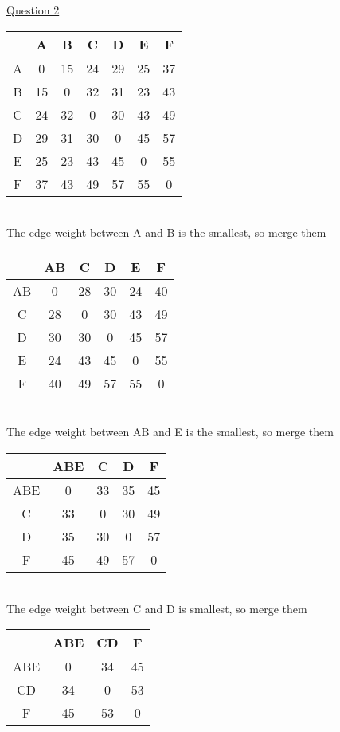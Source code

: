 \documentclass{article}[18pt]
\begin{document}
\begin{center}
\underline{\huge Question 2}
\end{center}
\begin{tabular}{|c|c|c|c|c|c|c|}
	\hline 
	& A & B & C & D & E & F \\ 
	\hline 
	A & 0 & 15 & 24 & 29 & 25 & 37 \\ 
	\hline 
	B & 15 & 0 & 32 & 31 & 23 & 43 \\ 
	\hline 
	C & 24 & 32 & 0 & 30 & 43 & 49 \\ 
	\hline 
	D & 29 & 31 & 30 & 0 & 45 & 57 \\ 
	\hline 
	E & 25 & 23 & 43 & 45 & 0 & 55 \\ 
	\hline 
	F & 37 & 43 & 49 & 57 & 55 & 0 \\ 
	\hline 
\end{tabular} \\
The edge weight between A and B is the smallest, so merge them
\vspace{1cm}
\\
\begin{tabular}{|c|c|c|c|c|c|}
	\hline 
	& AB & C & D & E & F \\ 
	\hline 
	AB & 0 & 28 & 30 & 24 & 40 \\ 
	\hline 
	C & 28 & 0 & 30 & 43 & 49 \\ 
	\hline 
	D & 30 & 30 & 0 & 45 & 57 \\ 
	\hline 
	E & 24 & 43 & 45 & 0 & 55 \\ 
	\hline 
	F & 40 & 49 & 57 & 55 & 0 \\ 
	\hline 
\end{tabular} \\
The edge weight between AB and E is the smallest, so merge them
\vspace{1cm}
\\
\begin{tabular}{|c|c|c|c|c|}
	\hline 
	& ABE & C & D & F \\ 
	\hline 
	ABE & 0 & 33 & 35 & 45 \\ 
	\hline 
	C & 33 & 0 & 30 & 49 \\ 
	\hline 
	D & 35 & 30 & 0 & 57 \\ 
	\hline 
	F & 45 & 49 & 57 & 0 \\ 
	\hline 
\end{tabular} \\
The edge weight between C and D is smallest, so merge them
\vspace{1cm}
\\
\begin{tabular}{|c|c|c|c|}
	\hline 
	& ABE & CD & F \\ 
	\hline 
	ABE & 0 & 34 & 45 \\ 
	\hline 
	CD & 34 & 0 & 53 \\ 
	\hline 
	F & 45 & 53 & 0 \\ 
	\hline 
\end{tabular} \\
\end{document}
